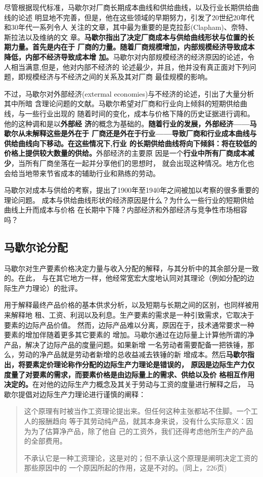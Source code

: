 尽管根据现代标准，马歇尔对厂商长期成本曲线和供给曲线，以及行业长期供给曲线的论述
明显地不完善，但是，他在这些领域的早期努力，引发了20世纪20年代和30年代一系列令人
关注的文章，其中最为重要的是克拉彭(Clapham)、奈特、斯拉法以及维纳的文
章。\textbf{马歇尔指出了决定厂商成本与供给曲线形状与位置的长期力量。首先是内在于
  厂商的力量。随着厂商规模增加，内部规模经济导致成本降低，内部不经济导致成本增
  加。}马歇尔对内部规模经济的经济原因的论述，令人相当满意,但是，他对内部不经济的
论述最少，并且，他并没有真正面对下列问题，即规模经济与不经济之间的关系及其对厂商
最佳规模的影响。

不过，马歇尔对外部经济(extermal economies)与不经济的论述，引出了大量分析其中所暗
含理论问题的文献。马歇尔希望对厂商和行业向上倾斜的短期供给曲线，与一些行业出现的
随着时间的变化，成本与价格下降的历史证据进行调和。他的这种调和是以\textbf{外部经
  济}的概念为基础的。\textbf{随着行业的发展，外部经济——马歇尔从未解释这些是外在于
  厂商还是外在于行业——导致厂商和行业成本曲线与供给曲线向下移动。在这些情况下,行业
  的长期供给曲线将向下倾斜：将在较低的价格上提供较大数量的供给。}外部经济的主要原
因是一个\textbf{行业中所有厂商成本减少}，当所有厂商坐落在一起并分享他们的思想时，
就会出现这种情况。地方化也会给当地带来节省成本的辅助行业和熟练的劳动。

马歇尔对成本与供给的考察，提出了1900年至1940年之间被加以考察的很多重要的理论问题。
成本与供给曲线形状的经济原因是什么？为什么一些行业的短期供给曲线上升而成本与价格
在长期中下降？内部经济和外部经济与竞争性市场相容吗？

\subsection{马歇尔论分配}

马歇尔对生产要素价格决定力量与收入分配的解释，与其分析中的其余部分是一致的。在此，
与在其它地方一样，他经常宽宏大度地认同对其理论（例如分配的边际生产力理论）的批评。

用于解释最终产品价格的基本供求分析，以及短期与长期之间的区别，也同样被用来解释地
租、工资、利润以及利息。生产要素的需求是一种引致需求，它取决于要素的边际产品价值。
然而，边际产品难以分离，原因在于，技术通常要求一种要素的增加伴随着更多其它要素的
增加。马歇尔通过在边际量上计算他所谓的净产品，解决了边际产品的度量问题。如果新增
一名劳动者需要配备一把铁锤，那么，劳动的净产品就是劳动者新增的总收益减去铁锤的新
增成本。然后\textbf{马歇尔指出，将要素定价理论称作分配的边际生产力理论是错误的，
  原因是边际生产力仅度量了对要素的需求，而要素价格是由边际量上的需求、供给以及价
  格相互作用决定的。}在对他的边际生产力概念及其关于劳动与工资的度量进行解释之后，
马歇尔提倡对边际生产力理论进行谨慎的阐释：
\begin{quotation}
  这个原理有时被当作工资理论提出来。但任何这种主张都站不住脚。一个工人的报酬趋向
  等于其劳动纯产品，就其本身来说，没有什么实际意义：因为为了估算净产品，除了他自
  己的工资外，我们还得考虑他所生产的产品的全部费用。

  不承认它是一种工资理论，这是对的；但不承认这个原理是阐明决定工资的那些原因中的
  一个原因所起的作用，这是不对的。(同上，226页)
\end{quotation}

